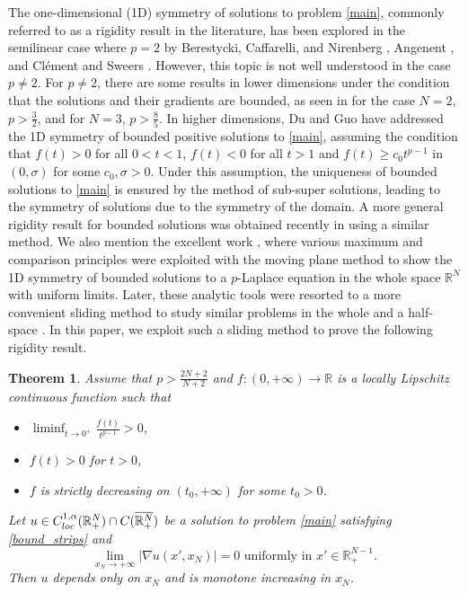 \documentclass[reqno]{amsart}
\theoremstyle{plain}
\newtheorem{theorem}{Theorem}
\theoremstyle{definition}
\theoremstyle{remark}
\begin{document}
	The one-dimensional (1D) symmetry of solutions to problem \eqref{main}, commonly referred to as a rigidity result in the literature, has been explored in the semilinear case where $p = 2$ by Berestycki, Caffarelli, and Nirenberg \cite{MR1470317,MR1655510}, Angenent \cite{MR794096}, and Clément and Sweers \cite{MR937538}. However, this topic is not well understood in the case $p\ne2$. For $p \ne 2$, there are some results in lower dimensions under the condition that the solutions and their gradients are bounded, as seen in \cite{MR2654242} for the case $N = 2$, $p > \frac{3}{2}$, and \cite{MR3118616,MR2886112} for $N = 3$, $p > \frac{8}{5}$. In higher dimensions, Du and Guo \cite{MR2056284} have addressed the 1D symmetry of bounded positive solutions to \eqref{main}, assuming the condition that $f(t)>0$ for all $0<t<1$, $f(t)<0$ for all $t>1$ and $f(t) \ge c_0 t^{p-1}$ in $(0,\sigma)$ for some $c_0,\sigma>0$. Under this assumption, the uniqueness of bounded solutions to \eqref{main} is ensured by the method of sub-super solutions, leading to the symmetry of solutions due to the symmetry of the domain. A more general rigidity result for bounded solutions was obtained recently in \cite{2024arXiv240904804L} using a similar method. We also mention the excellent work \cite{MR4377321}, where various maximum and comparison principles were exploited with the moving plane method to show the 1D symmetry of bounded solutions to a $p$-Laplace equation in the whole space $\mathbb{R}^N$ with uniform limits. Later, these analytic tools were resorted to a more convenient sliding method to study similar problems in the whole and a half-space \cite{MR4771444,MR4635360}.	
	In this paper, we exploit such a sliding method to prove the following rigidity result.
	\begin{theorem}\label{th:rigidity1}
		Assume that $p>\frac{2N+2}{N+2}$ and $f:(0,+\infty)\to\mathbb{R}$ is a locally Lipschitz continuous function such that
		\begin{itemize}
			\item[(i)] $\liminf_{t\to0^+} \frac{f(t)}{t^{p-1}} > 0$,
			\item[(ii)] $f(t)>0$ for $t>0$,
			\item[(iii)] $f$ is strictly decreasing on $(t_0,+\infty)$ for some $t_0>0$.
		\end{itemize}
		Let $u \in C^{1,\alpha}_{\rm loc}(\mathbb{R}^N_+) \cap C(\overline{\mathbb{R}^N_+})$ be a solution to problem \eqref{main} satisfying \eqref{bound_strips} and
		\begin{equation}\label{uni_gradient_zero}
			\lim_{x_N\to+\infty} |\nabla u(x',x_N)|=0 \text{ uniformly in } x'\in\mathbb{R}^{N-1}_+.
		\end{equation}		
		Then $u$ depends only on $x_N$ and is monotone increasing in $x_N$.
	\end{theorem}	
\end{document}
